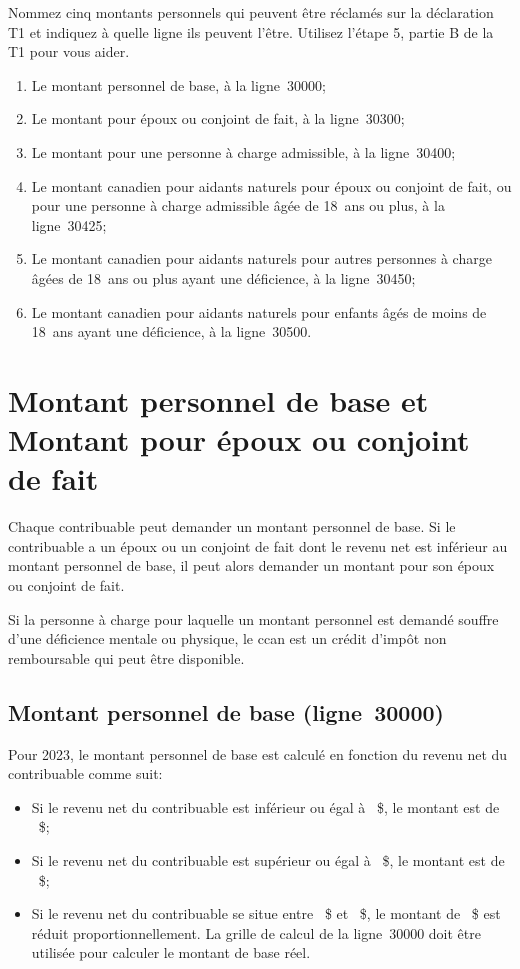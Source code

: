 \begin{question}
	Nommez cinq montants personnels qui peuvent être réclamés sur la déclaration T1 et indiquez à quelle ligne ils peuvent l'être. Utilisez l'étape 5, partie B de la T1 pour vous aider.
\end{question}
\begin{enumerate}
	\item Le montant personnel de base, à la ligne~30000; 
	\item Le montant pour époux ou conjoint de fait, à la ligne~30300; 
	\item Le montant pour une personne à charge admissible, à la ligne~30400;
	\item Le montant canadien pour aidants naturels pour époux ou conjoint de fait, ou pour une personne à charge admissible âgée de 18~ans ou plus, à la ligne~30425;
	\item Le montant canadien pour aidants naturels pour autres personnes à charge âgées de 18~ans ou plus ayant une déficience, à la ligne~30450;
	\item Le montant canadien pour aidants naturels pour enfants âgés de moins de 18~ans ayant une déficience, à la ligne~30500.
\end{enumerate}



\section{Montant personnel de base et Montant pour époux ou conjoint de fait}
\begin{intro}
	Chaque contribuable peut demander un montant personnel de base. Si le contribuable a un époux ou un conjoint de fait dont le revenu net est inférieur au montant personnel de base, il peut alors demander un montant pour son époux ou conjoint de fait. 
	
	Si la personne à charge pour laquelle un montant personnel est demandé souffre d'une déficience mentale ou physique, le \acrfull{ccan} est un crédit d'impôt non remboursable qui peut être disponible.
\end{intro}


\subsection{Montant personnel de base (ligne~30000)}
Pour 2023, le montant personnel de base est calculé en fonction du revenu net du contribuable comme suit:
\begin{itemize}
	\item Si le revenu net du contribuable est inférieur ou égal à ~\$, le montant est de ~\$;
	\item Si le revenu net du contribuable est supérieur ou égal à ~\$, le montant est de ~\$;
	\item Si le revenu net du contribuable se situe entre ~\$ et ~\$, le montant de ~\$ est réduit proportionnellement. La grille de calcul de la ligne~30000 doit être utilisée pour calculer le montant de base réel.
\end{itemize}

